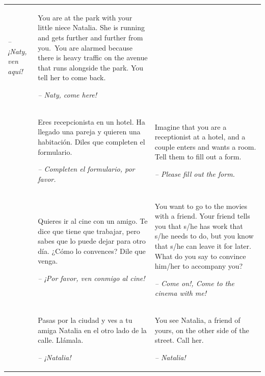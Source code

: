 \begin{xltabular}{\textwidth}{lQQ}
\textit{-- ¡Naty, ven aquí!} & You are at the park with your little niece Natalia. She is running and gets further and further from you.~You are alarmed because there is heavy traffic on the avenue that runs alongside the park. You tell her to come back.

{\itshape -- Naty, come here!}\\
 & Eres recepcionista en un hotel. Ha llegado una pareja y quieren una habitación. Diles que completen el formulario.

\textit{-- Completen el formulario, por favor.} & Imagine that you are a receptionist at a hotel, and a couple enters and wants a room. Tell them to fill out a form.

{\itshape -- Please fill out the form.}\\
 & Quieres ir al cine con un amigo. Te dice que tiene que trabajar, pero sabes que lo puede dejar para otro día. ¿Cómo lo convences? Dile que venga.

\textit{-- ¡Por favor, ven conmigo al cine!} & You want to go to the movies with a friend. Your friend tells you that s/he has work that s/he needs to do, but you know that s/he can leave it for later. What do you say to convince him/her to accompany you?

{\itshape -- Come on!, Come to the cinema with me!}\\
 & Pasas por la ciudad y ves a tu amiga Natalia en el otro lado de la calle. Llámala.

\textit{-- ¡Natalia!} & You see Natalia, a friend of yours, on the other side of the street. Call her.

\textit{-- Natalia!}\\
\end{xltabular}

\newpage
